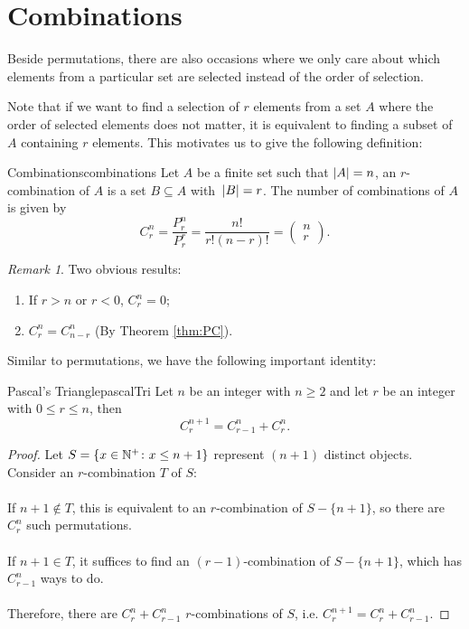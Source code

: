 \documentclass[math]{amznotes}
\theoremstyle{remark}
\newtheorem*{remark}{Remark}
\begin{document}
\section{Combinations}
Beside permutations, there are also occasions where we only care about which elements from a particular set are selected instead of the order of selection.

Note that if we want to find a selection of $r$ elements from a set $A$ where the order of selected elements does not matter, it is equivalent to finding a subset of $A$ containing $r$ elements. This motivates us to give the following definition:
\begin{dfnbox}{Combinations}{combinations}
    Let $A$ be a finite set such that ${\left\lvert {A} \right\rvert} = n$, an $r$-combination of $A$ is a set $B \subseteq A$ with~${\left\lvert {B} \right\rvert} = r$. The number of combinations of $A$ is given by
    \begin{equation*}
        C^n_r = \frac{P^n_r}{P^r_r} = \frac{n!}{r!(n - r)!} = \begin{pmatrix}
            n \\
            r
        \end{pmatrix}.
    \end{equation*}
\end{dfnbox}
\begin{notebox}
    \begin{remark}
        Two obvious results:
        \begin{enumerate}
            \item If $r > n$ or $r < 0$, $C^n_r = 0$;
            \item $C^n_r = C^n_{n - r}$ (By Theorem \ref{thm:PC}).
        \end{enumerate}
    \end{remark}
\end{notebox}
Similar to permutations, we have the following important identity:
\begin{thmbox}{Pascal's Triangle}{pascalTri}
    Let $n$ be an integer with $n \geq 2$ and let $r$ be an integer with $0 \leq r \leq n$, then
    \begin{equation*}
        C^{n + 1}_r = C^{n}_{r - 1} + C^{n}_r.
    \end{equation*}
    \tcblower
    \begin{proof}
        Let $S = \left\{x \in \mathbb{N}^+ \colon x \leq n + 1\right\}$ represent $(n + 1)$ distinct objects. Consider an $r$-combination $T$ of $S$:
        \\\\
        If $n + 1 \notin T$, this is equivalent to an $r$-combination of $S - \{n + 1\}$, so there are $C^n_r$ such permutations.
        \\\\
        If $n + 1 \in T$, it suffices to find an $(r - 1)$-combination of $S - \{n + 1\}$, which has $C^n_{r - 1}$ ways to do.
        \\\\
        Therefore, there are $C^n_{r} + C^n_{r - 1}$ $r$-combinations of $S$, i.e. $C^{n + 1}_r = C^n_r + C^n_{r - 1}$. 
    \end{proof}
\end{thmbox}
\end{document}
